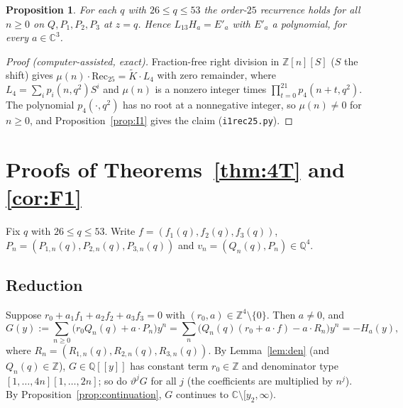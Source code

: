 \documentclass[11pt]{amsart}
\newtheorem{proposition}{Proposition}[section]
\theoremstyle{definition}
\theoremstyle{remark}
\numberwithin{equation}{section}
\newcommand{\ZZ}{\mathbb{Z}}
\newcommand{\QQ}{\mathbb{Q}}
\newcommand{\CC}{\mathbb{C}}
\newcommand{\file}[1]{{\def\_{\textunderscore\allowbreak}\texttt{#1}}}
\begin{document}
\begin{proposition}\label{prop:I1prime}
For each $q$ with $26\le q\le53$ the order-$25$ recurrence holds for all $n\ge0$ on $Q,P_1,P_2,P_3$ at $z=q$. Hence
$L_{13}H_a=E'_a$ with $E'_a$ a polynomial, for every $a\in\CC^3$.
\end{proposition}

\begin{proof}[Proof (computer-assisted, exact)]
Fraction-free right division in $\ZZ[n][S]$ ($S$ the shift) gives $\mu(n)\cdot\mathrm{Rec}_{25}=\tilde K\cdot L_4$ with
zero remainder, where $L_4=\sum_ip_i(n,q^2)S^i$ and $\mu(n)$ is a nonzero integer times
$\prod_{t=0}^{21}p_4(n+t,q^2)$. The polynomial $p_4(\cdot,q^2)$ has no root at a nonnegative integer, so $\mu(n)\ne0$
for $n\ge0$, and Proposition~\ref{prop:I1} gives the claim (\file{i1\_rec25.py}).
\end{proof}

\section{Proofs of Theorems~\ref{thm:4T} and \ref{cor:F1}}\label{sec:proof4T}

Fix $q$ with $26\le q\le53$. Write $f=(f_1(q),f_2(q),f_3(q))$, $P_n=(P_{1,n}(q),P_{2,n}(q),P_{3,n}(q))$ and
$v_n=(Q_n(q),P_n)\in\QQ^4$.

\subsection{Reduction}
Suppose $r_0+a_1f_1+a_2f_2+a_3f_3=0$ with $(r_0,a)\in\ZZ^4\setminus\{0\}$. Then $a\ne0$, and
\[
G(y):=\sum_{n\ge0}\bigl(r_0Q_n(q)+a\cdot P_n\bigr)y^n
=\sum_n\bigl(Q_n(q)(r_0+a\cdot f)-a\cdot R_n\bigr)y^n=-H_a(y),
\]
where $R_n=(R_{1,n}(q),R_{2,n}(q),R_{3,n}(q))$.
By Lemma~\ref{lem:den} (and $Q_n(q)\in\ZZ$), $G\in\QQ[[y]]$ has constant term $r_0\in\ZZ$ and denominator type
$[1,\dots,4n][1,\dots,2n]$; so do $\vartheta^jG$ for all $j$ (the coefficients are multiplied by $n^j$). By
Proposition~\ref{prop:continuation}, $G$ continues to $\CC\setminus[y_2,\infty)$.
\end{document}
